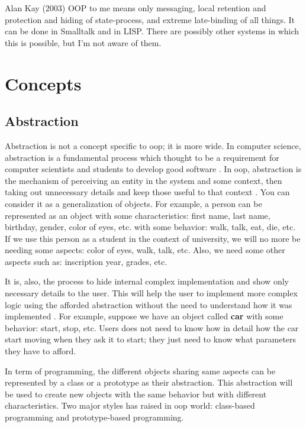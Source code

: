 \documentclass[12pt]{book}
\begin{document}
\begin{kodequote}{Alan Kay (2003)}
	OOP to me means only messaging, local retention and protection and hiding of state-process, and extreme late-binding of all things. 
	It can be done in Smalltalk and in LISP. 
	There are possibly other systems in which this is possible, but I'm not aware of them.
\end{kodequote}




\section{Concepts}

\subsection{Abstraction}

Abstraction is not a concept specific to \ac{oop}; it is more wide. 
In computer science, abstraction is a fundamental process which thought to be a requirement for computer scientists and students to develop good software \citep{2013-saitta-zucker}.
In \ac{oop}, abstraction is the mechanism of perceiving an entity in the system and some context, then taking out unnecessary details and keep those useful to that context \citep{2014-rahman}.
You can consider it as a generalization of objects.
For example, a person can be represented as an object with some characteristics: first name, last name, birthday, gender, color of eyes, etc. with some behavior: walk, talk, eat, die, etc. 
If we use this person as a student in the context of university, we will no more be needing some aspects: color of eyes, walk, talk, etc. 
Also, we need some other aspects such as: inscription year, grades, etc. 

It is, also, the process to hide internal complex implementation and show only necessary details to the user. 
This will help the user to implement more complex logic using the afforded abstraction without the need to understand how it was implemented \citep{2017-janssen}.
For example, suppose we have an object called \textbf{car} with some behavior: start, stop, etc. 
Users does not need to know how in detail how the car start moving when they ask it to start; they just need to know what parameters they have to afford.

In term of programming, the different objects sharing same aspects can be represented by a class or a prototype as their abstraction. 
This abstraction will be used to create new objects with the same behavior but with different characteristics. 
Two major styles has raised in \ac{oop} world: class-based programming and prototype-based programming.
\end{document}
